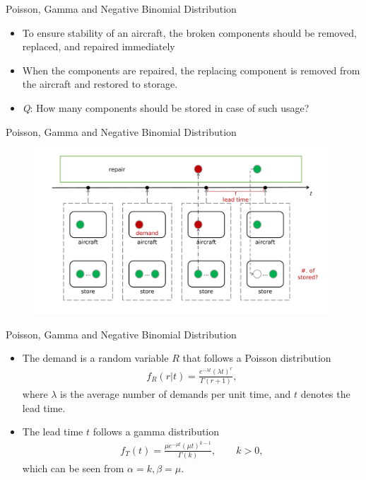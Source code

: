 \begin{frame}{Poisson, Gamma and Negative Binomial Distribution}

\begin{itemize}
	\justifying
	\item To ensure stability of an aircraft, the broken components should be removed, replaced, and repaired immediately
	\item When the components are repaired, the replacing component is removed from the aircraft and restored to storage.
	\item \emph{Q}: How many components should be stored in case of such usage?
\end{itemize}


\end{frame}


\begin{frame}{Poisson, Gamma and Negative Binomial Distribution}

\begin{figure}[htbp]
	\centering
	\includegraphics[width=11cm]{./images/rc2fig7.pdf}
\end{figure}


\end{frame}


\begin{frame}{Poisson, Gamma and Negative Binomial Distribution}

\begin{itemize}
	\justifying
	\item The demand is a random variable $R$ that follows a Poisson distribution
	\begin{align*}
	f_R(r|t) = \frac{e^{-\lambda t}(\lambda t)^r}{\Gamma(r + 1)},
	\end{align*}
	where $\lambda$ is the average number of demands per unit time, and $t$ denotes the lead time.
	\item The lead time $t$ follows a gamma distribution
	\begin{align*}
	f_T(t) = \frac{\mu e^{-\mu t} (\mu t)^{k-1}}{\Gamma(k)}, \qquad k > 0,
	\end{align*}
	which can be seen from $\alpha = k, \beta = \mu$.
\end{itemize}


\end{frame}

